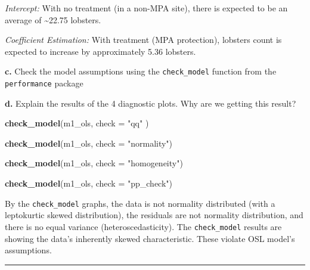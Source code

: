 \documentclass[
]{article}
\newenvironment{Shaded}{\begin{snugshade}}{\end{snugshade}}
\newcommand{\AttributeTok}[1]{\textcolor[rgb]{0.13,0.29,0.53}{#1}}
\newcommand{\FunctionTok}[1]{\textcolor[rgb]{0.13,0.29,0.53}{\textbf{#1}}}
\newcommand{\NormalTok}[1]{#1}
\newcommand{\StringTok}[1]{\textcolor[rgb]{0.31,0.60,0.02}{#1}}
\begin{document}
\emph{Intercept:} With no treatment (in a non-MPA site), there is
expected to be an average of \textasciitilde22.75 lobsters.

\emph{Coefficient Estimation:} With treatment (MPA protection), lobsters
count is expected to increase by approximately 5.36 lobsters.

\textbf{c.} Check the model assumptions using the \texttt{check\_model}
function from the \texttt{performance} package

\textbf{d.} Explain the results of the 4 diagnostic plots. Why are we
getting this result?

\begin{Shaded}
\begin{Highlighting}[]
\FunctionTok{check\_model}\NormalTok{(m1\_ols,  }\AttributeTok{check =} \StringTok{"qq"}\NormalTok{ )}
\end{Highlighting}
\end{Shaded}

\begin{Shaded}
\begin{Highlighting}[]
\FunctionTok{check\_model}\NormalTok{(m1\_ols, }\AttributeTok{check =} \StringTok{"normality"}\NormalTok{)}
\end{Highlighting}
\end{Shaded}

\begin{Shaded}
\begin{Highlighting}[]
\FunctionTok{check\_model}\NormalTok{(m1\_ols, }\AttributeTok{check =} \StringTok{"homogeneity"}\NormalTok{)}
\end{Highlighting}
\end{Shaded}

\begin{Shaded}
\begin{Highlighting}[]
\FunctionTok{check\_model}\NormalTok{(m1\_ols, }\AttributeTok{check =} \StringTok{"pp\_check"}\NormalTok{)}
\end{Highlighting}
\end{Shaded}

By the \texttt{check\_model} graphs, the data is not normality
distributed (with a leptokurtic skewed distribution), the residuals are
not normality distribution, and there is no equal variance
(heteroscedasticity). The \texttt{check\_model} results are showing the
data's inherently skewed characteristic. These violate OSL model's
assumptions.

\begin{center}\rule{0.5\linewidth}{0.5pt}\end{center}
\end{document}
